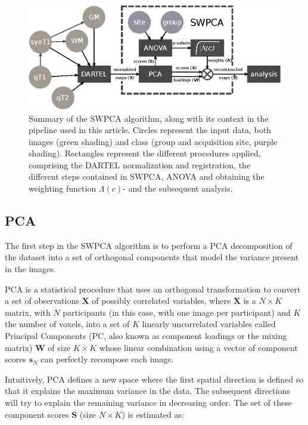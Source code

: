 \begin{figure}
\centering
\includegraphics[width=\linewidth]{Graphics/ch7/FIGURE01}
\caption[Summary of the \acs{SWPCA} algorithm, along with its context in the pipeline used in this article.]{Summary of the \ac{SWPCA} algorithm, along with its context in the pipeline used in this article. Circles represent the input data, both images (green shading) and class (group and acquisition site, purple shading). Rectangles represent the different procedures applied, comprising the DARTEL normalization and registration, the different steps contained in \ac{SWPCA}, \ac{ANOVA} and obtaining the weighting function $\Lambda(c)$- and the subsequent analysis.}
\label{fig:swpcaschema}
\end{figure}


\subsection{\acf{PCA}}\label{sec:pca}
The first step in the \ac{SWPCA} algorithm is to perform a \ac{PCA} decomposition
of the dataset into a set of orthogonal components that model the
variance present in the images. 

\ac{PCA} is a statistical procedure that uses an orthogonal transformation to convert a set of observations $\mathbf{X}$ of possibly correlated variables, where $\mathbf{X}$ is a $N\times K$ matrix, with $N$ participants (in this case, with one image per participant) and $K$ the number of voxels, into a set of $K$ linearly uncorrelated variables called Principal Components (PC, also known as component loadings or the mixing matrix)  $\mathbf{W}$ of size $K\times K$ whose linear combination using a vector of component scores  $\mathbf{s}_{N}$ can perfectly recompose each image. 

Intuitively, \ac{PCA} defines a new space where the first spatial direction is defined so that it explains the maximum variance in the data. The subsequent directions will try to explain the remaining variance in decreasing order. The set of these component scores  $\mathbf{S}$ (size $N \times K$) is estimated as:

